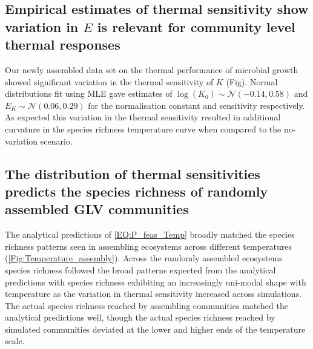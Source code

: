 \documentclass{article}
\begin{document}
\subsection{Empirical estimates of thermal sensitivity show variation in $E$ is relevant for community level thermal responses}

Our newly assembled data set on the thermal performance of microbial growth showed significant variation in the thermal sensitivity of $K$ (Fig). Normal distributions fit using MLE  gave estimates of $\log(K_0) \sim \mathcal{N}(-0.14,0.58)$ and $E_K \sim \mathcal{N}(0.06,0.29)$ for the normalisation constant and sensitivity respectively. As expected this variation in the thermal sensitivity resulted in additional curvature in the species richness temperature curve when compared to the no-variation scenario. 

\subsection{The distribution of thermal sensitivities predicts the species richness of randomly assembled GLV communities}

The analytical predictions of \cref{EQ:P_feas_Temp} broadly matched the species richness patterns seen in assembling ecosystems across different temperatures (\cref{Fig:Temperature_assembly}). Across the randomly assembled ecosystems species richness followed the broad patterns expected from the analytical predictions with species richness exhibiting an increasingly uni-modal shape with temperature as the variation in thermal sensitivity increased across simulations. The actual species richness reached by assembling communities matched the analytical predictions well, though the actual species richness reached by simulated communities deviated at the lower and higher ends of the temperature scale. 
\end{document}
